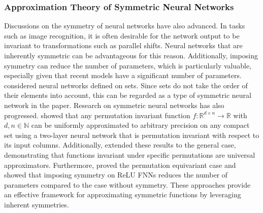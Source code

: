 \subsubsection{Approximation Theory of Symmetric Neural Networks}
Discussions on the symmetry of neural networks have also advanced. In tasks such as image recognition, it is often desirable for the network output to be invariant to transformations such as parallel shifts. Neural networks that are inherently symmetric can be advantageous for this reason. Additionally, imposing symmetry can reduce the number of parameters, which is particularly valuable, especially given that recent models have a significant number of parameters.  
\cite{Zah17} considered neural networks defined on sets. Since sets do not take the order of their elements into account, this can be regarded as a type of symmetric neural network in the paper. Research on symmetric neural networks has also progressed. \cite{Yar18} showed that any permutation invariant function \( f: \mathbb{R}^{d \times n} \to \mathbb{R} \) with \( d, n \in \mathbb{N} \) can be uniformly approximated to arbitrary precision on any compact set using a two-layer neural network that is permutation invariant with respect to its input columns. Additionally, \cite{Mar19} extended these results to the general case, demonstrating that functions invariant under specific permutations are universal approximators. Furthermore, \cite{San19} proved the permutation equivariant case and showed that imposing symmetry on ReLU FNNs reduces the number of parameters compared to the case without symmetry. These approaches provide an effective framework for approximating symmetric functions by leveraging inherent symmetries.

